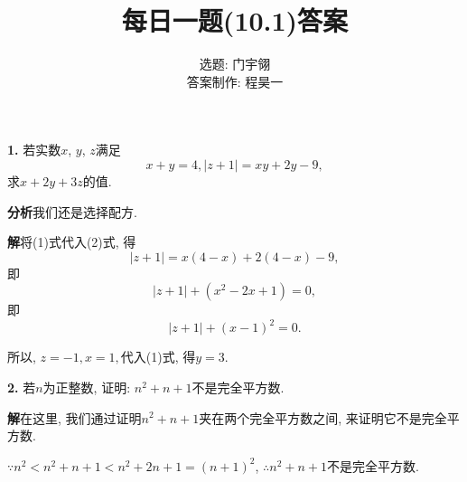 \documentclass{article}
\title{每日一题(10.1)答案}
\author{\kaishu 选题: 门宇翎\\\kaishu 答案制作: 程昊一}
\begin{document}
\maketitle
{\kaishu \textbf{1. }若实数$x$, $y$, $z$满足
\[x+y=4, |z+1|=xy+2y-9,\]
求$x+2y+3z$的值.\\\par}
\textbf{分析}\quad 我们还是选择配方.\par
\textbf{解}\quad 将(1)式代入(2)式, 得
\[|z+1|=x(4-x)+2(4-x)-9,\]
即
\[|z+1|+\left(x^2-2x+1\right)=0,\]
即
\[|z+1|+(x-1)^2=0.\]\par
所以, $z=-1, x=1, $代入(1)式, 得$y=3$.\\\par

{\kaishu \textbf{2. }若$n$为正整数, 证明: $n^2+n+1$不是完全平方数.}\\\par
\textbf{解}\quad 在这里, 我们通过证明$n^2+n+1$夹在两个完全平方数之间, 来证明它不是完全平方数. \par
$\because n^2<n^2+n+1<n^2+2n+1=(n+1)^2$, $\therefore n^2+n+1$不是完全平方数. 
\end{document}
